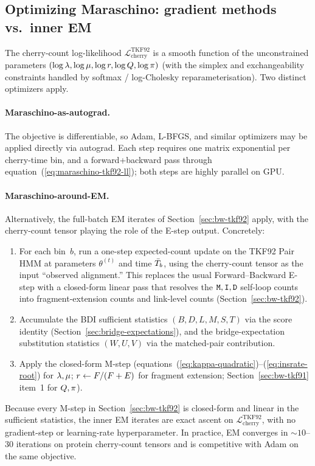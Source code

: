 \subsection{Optimizing Maraschino: gradient methods vs.\ inner EM}
\label{sec:maraschino-opt}

The cherry-count log-likelihood
$\mathcal{L}_{\text{cherry}}^{\mathrm{TKF92}}$ is a smooth function of
the unconstrained parameters
$(\log\lambda, \log\mu, \log r, \log Q, \log\pi)$
(with the simplex and exchangeability constraints handled by softmax /
log-Cholesky reparameterisation).  Two distinct optimizers apply.

\paragraph{Maraschino-as-autograd.}
The objective is differentiable, so Adam, L-BFGS, and similar
optimizers may be applied directly via autograd.  Each step requires one matrix
exponential per cherry-time bin, and a forward+backward pass through
equation~(\ref{eq:maraschino-tkf92-ll}); both steps are highly
parallel on GPU.

\paragraph{Maraschino-around-EM.}
\label{sec:maraschino-around-em}
Alternatively, the full-batch EM iterates of Section~\ref{sec:bw-tkf92}
apply, with the cherry-count tensor playing the role of the E-step
output.  Concretely:
\begin{enumerate}[nosep]
\item For each bin~$b$, run a one-step expected-count update on the
  TKF92 Pair HMM at parameters $\theta^{(t)}$ and time $\bar{T}_b$,
  using the cherry-count tensor as the input ``observed
  alignment.''  This replaces the usual Forward--Backward E-step with a
  closed-form linear pass that resolves the ${\tt M},{\tt I},{\tt D}$ self-loop
  counts into fragment-extension counts and link-level counts
  (Section~\ref{sec:bw-tkf92}).
\item Accumulate the BDI sufficient statistics
  $(B,D,L,M,S,T)$ via the score identity
  (Section~\ref{sec:bridge-expectations}), and the bridge-expectation substitution
  statistics $(W,U,V)$ via the matched-pair contribution.
\item Apply the closed-form M-step
  (equations~(\ref{eq:kappa-quadratic})--(\ref{eq:insrate-root})
  for $\lambda,\mu$;
  $r \leftarrow F/(F+E)$ for fragment extension;
  Section~\ref{sec:bw-tkf91} item~1 for $Q,\pi$).
\end{enumerate}
Because every M-step in Section~\ref{sec:bw-tkf92} is closed-form and
linear in the sufficient statistics, the inner EM iterates are exact
ascent on $\mathcal{L}_{\text{cherry}}^{\mathrm{TKF92}}$, with no
gradient-step or learning-rate hyperparameter.  In practice, EM
converges in ${\sim}10$--$30$ iterations on protein cherry-count
tensors and is competitive with Adam on the same objective.

